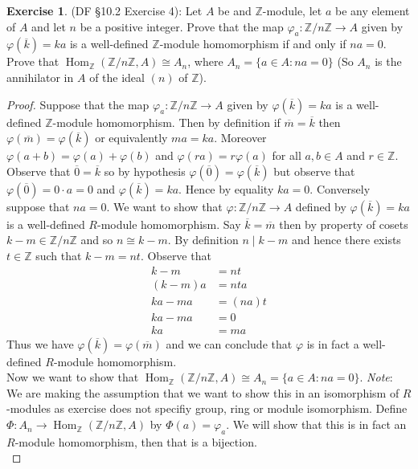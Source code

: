 \documentclass[8pt]{amsart}
\theoremstyle{plain}%
\theoremstyle{definition}
\newtheorem{exercise}{Exercise}[section]
\theoremstyle{remark}
\numberwithin{equation}{section}
\newcommand{\Z}{\mathbb{Z}}
\begin{document}
\begin{exercise}
(DF \S 10.2 Exercise 4): Let $A$ be and $\Z$-module, let $a$ be any element of $A$ and let $n$ be a positive integer. Prove that the map $\varphi_a : \Z/n\Z \to A$ given by $\varphi(\overline k) = ka$ is a well-defined $\mathbb Z$-module homomorphism if and only if $na = 0$. Prove that $\operatorname{Hom}_\Z(\Z/n\Z, A) \cong A_n$, where $A_n = \{a \in A : na = 0\}$ (So $A_n$ is the annihilator in $A$ of the ideal $(n)$ of $\Z$).
	\begin{proof}
		Suppose that the map $\varphi_a : \Z/n\Z \to A$ given by $\varphi(\overline k) = ka$ is a well-defined $\mathbb Z$-module homomorphism. Then by definition if $\overline m = \overline k$ then $\varphi(\overline m) = \varphi(\overline k)$ or equivalently $ma = ka$. Moreover $\varphi(a + b) = \varphi(a) + \varphi(b)$ and $\varphi(ra) = r\varphi(a)$ for all $a, b \in A$ and $r \in \Z$. Observe that $\overline 0 = \overline k$ so by hypothesis $\varphi(\overline 0) = \varphi(\overline k)$ but observe that $\varphi(\overline 0) = 0 \cdot a = 0$ and $\varphi(\overline k) = ka$. Hence by equality $ka = 0$. Conversely suppose that $na = 0$. We want to show that $\varphi : \Z/n\Z \to A$ defined by $\varphi(\overline k) = ka$ is a well-defined $R$-module homomorphism. Say $\overline k = \overline m$ then by property of cosets $k - m \in \Z/n\Z$ and so $n \cong k - m$. By definition $n \mid k - m$ and hence there exists $t \in \Z$ such that $k - m = nt$. Observe that
		\begin{align*}
			k - m &= nt\\
			(k - m)a &= nta\\
			ka - ma &= (na)t\\
			ka - ma &= 0\\
			ka &= ma 
		\end{align*}
		Thus we have $\varphi(\overline k) = \varphi(\overline m)$ and we can conclude that $\varphi$ is in fact a well-defined $R$-module homomorphism.\\

		Now we want to show that $\operatorname{Hom}_\Z(\Z/n\Z, A) \cong A_n = \{a \in A : na = 0\}$. \textit{Note}: We are making the assumption that we want to show this in an isomorphism of $R$-modules as exercise does not specifiy group, ring or module isomorphism. Define $\Phi : A_n \to \operatorname{Hom}_\Z(\Z/n\Z, A)$ by $\Phi(a) = \varphi_a$. We will show that this is in fact an $R$-module homomorphism, then that is a bijection.\\


\end{proof}
\end{exercise}
\end{document}
